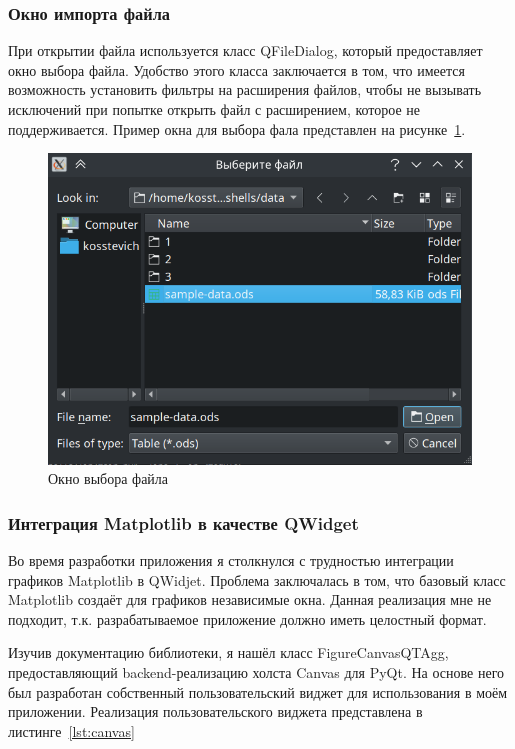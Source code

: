 \subsubsection{Окно импорта файла}

При открытии файла используется класс QFileDialog, который предоставляет окно выбора файла. Удобство этого класса заключается в том, что имеется возможность установить фильтры на расширения файлов, чтобы не вызывать исключений при попытке открыть файл с расширением, которое не поддерживается. Пример окна для выбора фала представлен на рисунке~\ref{fig:ris7}.

\begin{figure}[H]
	\centering
	\includegraphics[width=1\linewidth]{pics/ris7} %
	\caption{Окно выбора файла}
	\label{fig:ris7} %
\end{figure}

\subsubsection{Интеграция Matplotlib в качестве QWidget}

Во время разработки приложения я столкнулся с трудностью интеграции графиков Matplotlib в QWidjet. Проблема заключалась в том, что базовый класс Matplotlib создаёт для графиков независимые окна. Данная реализация мне не подходит, т.к. разрабатываемое приложение должно иметь целостный формат.

Изучив документацию библиотеки, я нашёл класс FigureCanvasQTAgg, предоставляющий backend-реализацию холста Canvas для PyQt. На основе него был разработан собственный пользовательский виджет для использования в моём приложении. Реализация пользовательского виджета представлена в листинге~\ref{lst:canvas}

